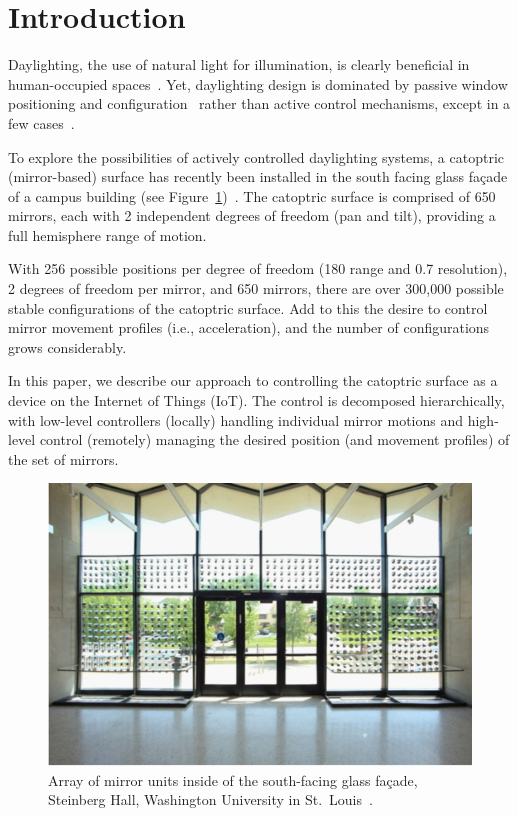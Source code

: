 \section{Introduction}
\label{sec:intro}

Daylighting, the use of natural light for illumination, is clearly
beneficial in human-occupied
spaces~\cite{hhm15,Leslie03}.
Yet, daylighting design is dominated by passive window positioning
and configuration~\cite{Leslie03} rather than active control mechanisms,
except in a few cases~\cite{kt16}.

To explore the possibilities of actively controlled daylighting systems,
a catoptric (mirror-based) surface has recently been installed in
the south facing glass fa\c cade of a campus building
(see Figure~\ref{fig:steinberg})~\cite{acadia18}.
The catoptric surface is comprised of 650 mirrors, each with 2 independent
degrees of freedom (pan and tilt), providing a full hemisphere
range of motion.

With 256 possible positions per degree of freedom (180\degree{} range
and 0.7\degree{} resolution), 2 degrees of freedom per mirror, and 650 mirrors, 
there are over 300,000 possible stable configurations of the catoptric surface.
Add to this the desire to control mirror movement profiles (i.e.,
acceleration), and the number of configurations grows considerably.

In this paper, we describe our approach to controlling the catoptric surface
as a device on the Internet of Things (IoT).
The control is decomposed hierarchically, with low-level controllers
(locally)
handling individual mirror motions and high-level control (remotely)
managing the
desired position (and movement profiles) of the set of mirrors.

\begin{figure}[ht]
\centering
\includegraphics[width=0.98\columnwidth]{steinberg}
\caption{Array of mirror units inside of the south-facing glass fa\c cade, Steinberg Hall, Washington University in St.~Louis~\protect\cite{acadia18}.}
\label{fig:steinberg}
\end{figure}


